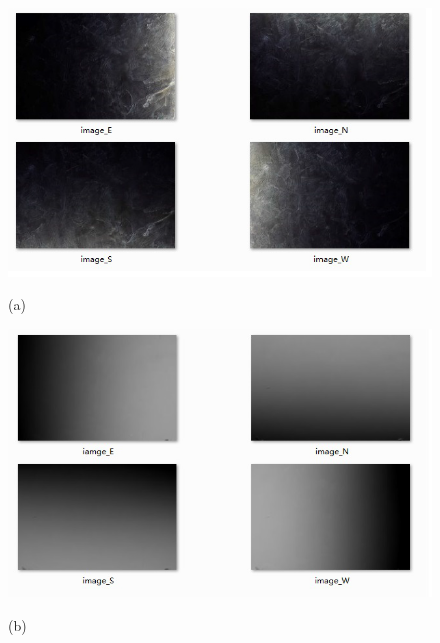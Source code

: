 \begin{figure}[htbp]

\begin{minipage}{0.48\linewidth}
\centerline{\includegraphics[width=1\linewidth]{figures/gaungxiansunshia.png}}
\centerline{(a)}
\end{minipage}
\begin{minipage}{0.48\linewidth}
\centerline{\includegraphics[width=1\linewidth]{figures/gaungxiansunshib.png}}
\centerline{(b)}
\end{minipage}



\end{figure}
